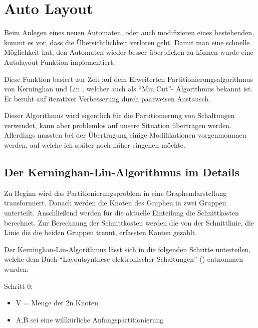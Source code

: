 

\chapter{Auto Layout}\label{AutoLayout}

Beim Anlegen eines neuen Automaten, oder auch modifizieren eines bestehenden,
kommt es vor, dass die Übersichtlichkeit verloren geht. Damit man eine schnelle
Möglichkeit hat, den Automaten wieder besser überblicken zu können wurde eine
Autolayout Funktion implementiert.\vspace{10pt}

Diese Funktion basiert zur Zeit auf dem Erweiterten Partitionierungsalgorithmus
von Kerninghan und Lin , welcher auch als "`Min Cut"'- Algorithmus
bekannt ist. Er beruht auf iterativer Verbesserung durch paarweisen
Austausch.\vspace{10pt}

Dieser Algorithmus wird eigentlich für die Partitionierung von Schaltungen
verwendet, kann aber problemlos auf unsere Situation übertragen werden.
Allerdings mussten bei der Übertragung einige Modifikationen
vorgenmommen werden, auf welche ich später noch näher eingehen
möchte.\vspace{10pt}

\section{Der Kerninghan-Lin-Algorithmus im Details}

Zu Beginn wird das Partitionierungsproblem in eine Graphendarstellung
transformiert. Danach werden die Knoten des Graphen in zwei Gruppen unterteilt.
Anschließend werden für die aktuelle Einteilung die Schnittkosten berechnet.
Zur Berechnung der Schnittkosten werden die von der Schnittlinie, die Linie die
die beiden Gruppen trennt, erfassten Kanten gezählt.\vspace{10pt}

Der Kerninghan-Lin-Algorithmus lässt sich in die folgenden Schritte
unterteilen, welche dem Buch "`Layoutsynthese elektronischer
Schaltungen"' (\cite{Layout}) entnommen wurden:\vspace{10pt}

Schritt 0:
\begin{itemize}
  \item V = Menge der 2n Knoten 
  \item {A,B} sei eine willkürliche Anfangspartitionierung
\end{itemize}

